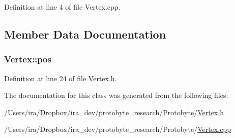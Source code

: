 Definition at line 4 of file Vertex.\-cpp.



\subsection{Member Data Documentation}
\hypertarget{class_vertex_aff9e2cd90a083d800a53100bccb26921}{
\subsubsection[{pos}]{ Vertex\-::pos}}\label{class_vertex_aff9e2cd90a083d800a53100bccb26921}


Definition at line 24 of file Vertex.\-h.



The documentation for this class was generated from the following files\-:\begin{DoxyCompactItemize}
\item 
/\-Users/ira/\-Dropbox/ira\-\_\-dev/protobyte\-\_\-research/\-Protobyte/\hyperlink{_vertex_8h}{Vertex.\-h}\item 
/\-Users/ira/\-Dropbox/ira\-\_\-dev/protobyte\-\_\-research/\-Protobyte/\hyperlink{_vertex_8cpp}{Vertex.\-cpp}\end{DoxyCompactItemize}
